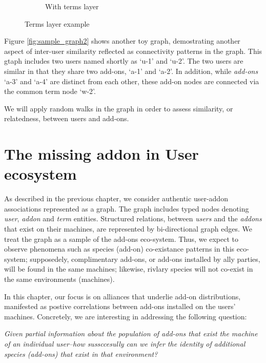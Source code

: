 \documentclass[11pt,oneside]{book}
\begin{document}
\begin{figure}[h]
\begin{subfigure}[b]{0.49\textwidth}
	\caption{With terms layer}
\end{subfigure}
	\caption{Terms layer example}
	\label{fig:terms_layer}
\end{figure}
  
Figure \ref{fig:sample_graph2} shows another toy graph, demostrating another aspect of inter-user similarity reflected as connectivity patterns in the graph. This gtaph includes two users named shortly as `u-1' and `u-2'. The two users are similar in that they share two add-ons, `a-1' and `a-2'. In addition, while {\it add-ons} `a-3' and `a-4' are distinct from each other, these add-on nodes are connected via the common term node `w-2'. 

We will apply random walks in the graph in order to assess similarity, or relatedness, between users and add-ons.  



\chapter{The missing addon in User ecosystem}
\label{chap:user_ecosystem}

As described in the previous chapter, we consider authentic user-addon
associations represented as a graph.  The graph includes typed nodes
denoting {\it user}, {\it addon} and {\it term} entities. Structured
relations, between {\it users} and the {\it addons} that exist on
their machines, are represented by bi-directional graph edges. We
treat the graph as a sample of the add-ons eco-system. Thus, we expect
to observe phenomena such as species (add-on) co-existance patterns in
this eco-system; supposedely, complimentary add-ons, or add-ons
installed by ally parties, will be found in the same machines;
likewise, rivlary species will not co-exist in the same environments
(machines).

In this chapter, our focus is on alliances that underlie add-on
distributions, manifested as postive correlations between add-ons
installed on the users' machines. Concretely, we are interesting in
addressing the following question:

{\it Given partial information about the population of add-ons that
  exist the machine of an individual user--how sussccesully can we
  infer the identity of additional species (add-ons) that exist in
  that environment?}
\end{document}
